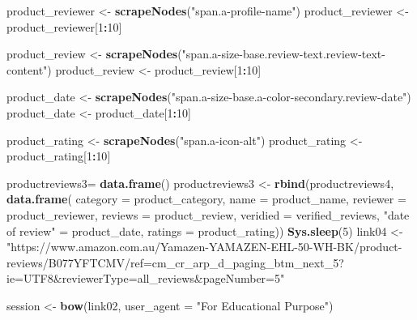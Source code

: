 \documentclass[
]{article}
\newenvironment{Shaded}{\begin{snugshade}}{\end{snugshade}}
\newcommand{\AttributeTok}[1]{\textcolor[rgb]{0.13,0.29,0.53}{#1}}
\newcommand{\DecValTok}[1]{\textcolor[rgb]{0.00,0.00,0.81}{#1}}
\newcommand{\FunctionTok}[1]{\textcolor[rgb]{0.13,0.29,0.53}{\textbf{#1}}}
\newcommand{\NormalTok}[1]{#1}
\newcommand{\OtherTok}[1]{\textcolor[rgb]{0.56,0.35,0.01}{#1}}
\newcommand{\SpecialCharTok}[1]{\textcolor[rgb]{0.81,0.36,0.00}{\textbf{#1}}}
\newcommand{\StringTok}[1]{\textcolor[rgb]{0.31,0.60,0.02}{#1}}
\begin{document}
\begin{Shaded}
\begin{Highlighting}[]
\NormalTok{  product\_reviewer }\OtherTok{\textless{}{-}} \FunctionTok{scrapeNodes}\NormalTok{(}\StringTok{"span.a{-}profile{-}name"}\NormalTok{)}
\NormalTok{  product\_reviewer }\OtherTok{\textless{}{-}}\NormalTok{ product\_reviewer[}\DecValTok{1}\SpecialCharTok{:}\DecValTok{10}\NormalTok{]}
  
\NormalTok{  product\_review }\OtherTok{\textless{}{-}} \FunctionTok{scrapeNodes}\NormalTok{(}\StringTok{"span.a{-}size{-}base.review{-}text.review{-}text{-}content"}\NormalTok{)}
\NormalTok{  product\_review }\OtherTok{\textless{}{-}}\NormalTok{ product\_review[}\DecValTok{1}\SpecialCharTok{:}\DecValTok{10}\NormalTok{]}
  
\NormalTok{  product\_date }\OtherTok{\textless{}{-}} \FunctionTok{scrapeNodes}\NormalTok{(}\StringTok{"span.a{-}size{-}base.a{-}color{-}secondary.review{-}date"}\NormalTok{)}
\NormalTok{  product\_date }\OtherTok{\textless{}{-}}\NormalTok{ product\_date[}\DecValTok{1}\SpecialCharTok{:}\DecValTok{10}\NormalTok{]}
  
\NormalTok{  product\_rating }\OtherTok{\textless{}{-}} \FunctionTok{scrapeNodes}\NormalTok{(}\StringTok{"span.a{-}icon{-}alt"}\NormalTok{)}
\NormalTok{  product\_rating }\OtherTok{\textless{}{-}}\NormalTok{ product\_rating[}\DecValTok{1}\SpecialCharTok{:}\DecValTok{10}\NormalTok{]}
  
\NormalTok{  productreviews3}\OtherTok{=} \FunctionTok{data.frame}\NormalTok{()}
\NormalTok{  productreviews3 }\OtherTok{\textless{}{-}} \FunctionTok{rbind}\NormalTok{(productreviews4, }\FunctionTok{data.frame}\NormalTok{(}
                      \AttributeTok{category =}\NormalTok{ product\_category,}
                      \AttributeTok{name =}\NormalTok{ product\_name,}
                      \AttributeTok{reviewer =}\NormalTok{ product\_reviewer,}
                      \AttributeTok{reviews =}\NormalTok{ product\_review,}
                      \AttributeTok{veridied =}\NormalTok{ verified\_reviews,}
                      \StringTok{"date of review"} \OtherTok{=}\NormalTok{ product\_date,}
                      \AttributeTok{ratings =}\NormalTok{ product\_rating))}
   \FunctionTok{Sys.sleep}\NormalTok{(}\DecValTok{5}\NormalTok{)}
\NormalTok{link04 }\OtherTok{\textless{}{-}} \StringTok{"https://www.amazon.com.au/Yamazen{-}YAMAZEN{-}EHL{-}50{-}WH{-}BK/product{-}reviews/B077YFTCMV/ref=cm\_cr\_arp\_d\_paging\_btm\_next\_5?ie=UTF8\&reviewerType=all\_reviews\&pageNumber=5"}


\NormalTok{  session }\OtherTok{\textless{}{-}} \FunctionTok{bow}\NormalTok{(link02,}
               \AttributeTok{user\_agent =} \StringTok{"For Educational Purpose"}\NormalTok{)}


\end{Highlighting}
\end{Shaded}
\end{document}
